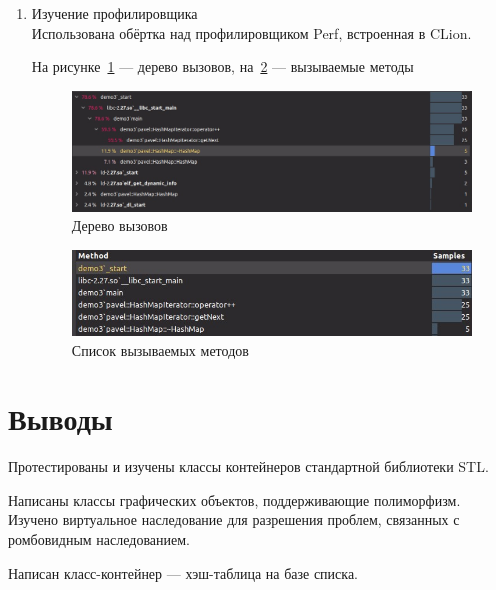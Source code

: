 \documentclass[a4paper, 14pt]{extarticle}
\begin{document}
\begin{enumerate}
    \item Изучение профилировщика\\
    Использована обёртка над профилировщиком Perf, встроенная в CLion.

    На рисунке~\ref{img:map:calltree} --- дерево вызовов, на~\ref{img:map:methods} --- вызываемые методы

    \begin{figure}[h]
        \centering
        \includegraphics[width=\textwidth]{./img/S008.jpg}
        \caption{Дерево вызовов}%
        \label{img:map:calltree}
    \end{figure}
    
    \begin{figure}[h]
        \centering
        \includegraphics[width=\textwidth]{./img/S009.jpg}
        \caption{Список вызываемых методов}%
        \label{img:map:methods}
    \end{figure}
    
    

    
\end{enumerate}
\section{Выводы}
Протестированы и изучены классы контейнеров стандартной библиотеки STL.\@ 

Написаны классы графических объектов, поддерживающие полиморфизм. Изучено виртуальное наследование для разрешения проблем, связанных с ромбовидным наследованием.

Написан класс-контейнер --- хэш-таблица на базе списка.
\end{document}
